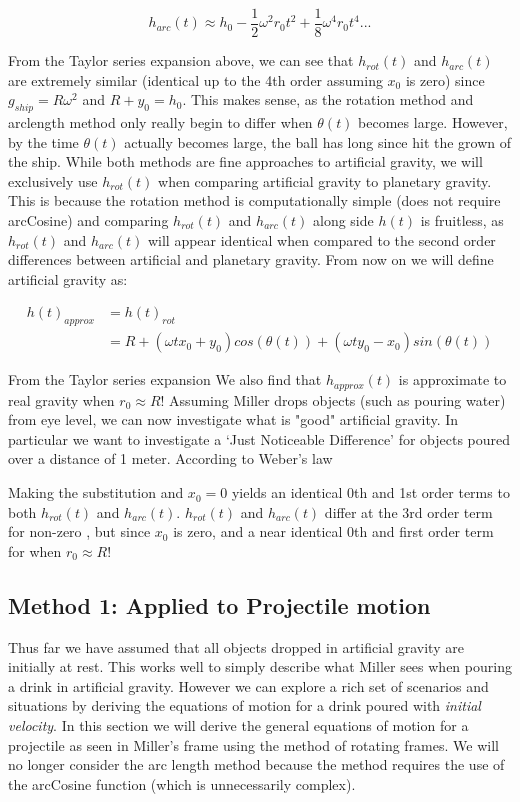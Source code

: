 \documentclass{amsart}
\theoremstyle{definition}
\begin{document}
\begin{equation}
 h_{arc}(t) \approx h_0 -\frac{1}{2}\omega^2 r_0 t^2 + \frac{1}{8}\omega^4 r_0 t^4 ...
\end{equation}

From the Taylor series expansion above, we can see that $h_{rot}(t)$
and $h_{arc}(t)$ are extremely similar (identical up to the 4th order
assuming $x_0$ is zero) since $g_{ship} = R \omega^2$ and $R+y_0 =
h_0$. This makes sense, as the rotation method and arclength method
only really begin to differ when $\theta(t)$ becomes large. However,
by the time $\theta(t)$ actually becomes large, the ball has long
since hit the grown of the ship. While both methods are fine
approaches to artificial gravity, we will exclusively use $h_{rot}(t)$
when comparing artificial gravity to planetary gravity. This is
because the rotation method is computationally simple (does not
require arcCosine) and comparing $h_{rot}(t)$ and $h_{arc}(t)$ along
side $h(t)$ is fruitless, as $h_{rot}(t)$ and $h_{arc}(t)$ will appear
identical when compared to the second order differences between
artificial and planetary gravity. From now on we will define
artificial gravity as:

\begin{equation}\label{eq:approxGravHeight}
\begin{split}
    h(t)_{approx} &= h(t)_{rot} \\
    &=R+(\omega t x_0 + y_0)cos(\theta(t))+(\omega t y_0 - x_0)sin(\theta (t))
\end{split}
\end{equation}

From the Taylor series expansion We also find that $h_{approx}(t)$ is approximate to real gravity when $r_0 \approx R$! Assuming Miller drops objects (such as pouring water) from eye level, we can now investigate what is "good" artificial gravity. In particular we want to investigate a `Just Noticeable Difference' for objects poured over a distance of 1 meter. According to Weber's law

Making the substitution  and $x_0 =0$ yields an identical 0th and 1st order terms to both $h_{rot}(t)$ and $h_{arc}(t)$. $h_{rot}(t)$ and $h_{arc}(t)$ differ at the 3rd order term for non-zero , but since $x_0$ is zero,  and a near identical 0th and first order term for  when $r_0 \approx R$! 


\subsection*{Method 1: Applied to Projectile motion}
Thus far we have assumed that all objects dropped in artificial
gravity are initially at rest. This works well to simply describe what
Miller sees when pouring a drink in artificial gravity. However we can
explore a rich set of scenarios and situations by deriving the
equations of motion for a drink poured with \textit{initial
  velocity}. In this section we will derive the general equations of
motion for a projectile as seen in Miller's frame using the method of
rotating frames. We will no longer consider the arc length method
because the method requires the use of the arcCosine function (which
is unnecessarily complex).
\end{document}
